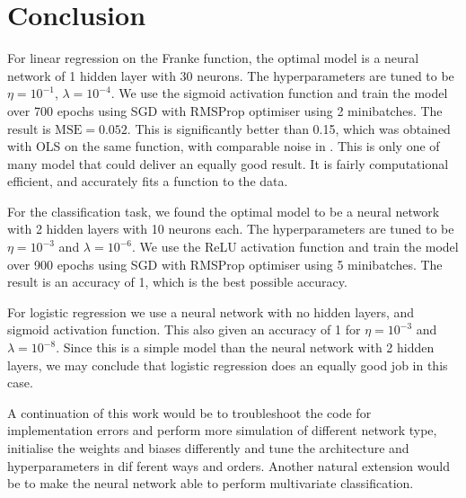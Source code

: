 \section{Conclusion}\label{sec:conclusion}

For linear regression on the Franke function, the optimal model is a neural network of 1 hidden layer with 30 neurons. The hyperparameters are tuned to be $\eta=10^{-1}$, $\lambda=10^{-4}$. We use the sigmoid activation function and train the model over 700 epochs using SGD with RMSProp optimiser using 2 minibatches. The result is $\mathrm{MSE} = 0.052$. This is significantly better than 0.15, which was obtained with OLS on the same function, with comparable noise in \projectOne. This is only one of many model that could deliver an equally good result. It is fairly computational efficient, and accurately fits a function to the data. 

For the classification task, we found the optimal model to be a neural network with 2 hidden layers with 10 neurons each. The hyperparameters are tuned to be $\eta=10^{-3}$ and $\lambda=10^{-6}$. We use the ReLU activation function and train the model over 900 epochs using SGD with RMSProp optimiser using 5 minibatches. The result is an accuracy of 1, which is the best possible accuracy. 

For logistic regression we use a neural network with no hidden layers, and sigmoid activation function. This also given an accuracy of 1 for $\eta=10^{-3}$ and $\lambda=10^{-8}$. Since this is a simple model than the neural network with 2 hidden layers, we may conclude that logistic regression does an equally good job in this case. 

A continuation of this work would be to troubleshoot the code for implementation errors and perform more simulation of different network type, initialise the weights and biases differently and tune the architecture and hyperparameters in dif ferent ways and orders. Another natural extension would be to make the neural network able to perform multivariate classification. 